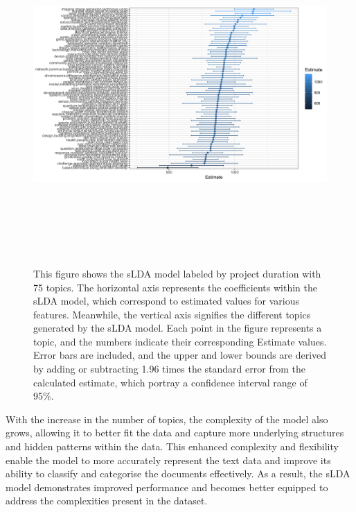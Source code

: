 \documentclass[12pt,twoside]{article}
\begin{document}
\begin{figure}[H]
    \hspace{-1cm}
    \includegraphics[width=18cm,height=13cm]{./figures/75-Duration}
    \caption{This figure shows the sLDA model labeled by project duration with 75 topics. The horizontal axis represents the coefficients within the sLDA model, which correspond to estimated values for various features. Meanwhile, the vertical axis signifies the different topics generated by the sLDA model. Each point in the figure represents a topic, and the numbers indicate their corresponding Estimate values. Error bars are included, and the upper and lower bounds are derived by adding or subtracting 1.96 times the standard error from the calculated estimate, which portray a confidence interval range of 95\%. }

\end{figure}

With the increase in the number of topics, the complexity of the model also grows, allowing it to better fit the data and capture more underlying structures and hidden patterns within the data. This enhanced complexity and flexibility enable the model to more accurately represent the text data and improve its ability to classify and categorise the documents effectively. As a result, the sLDA model demonstrates improved performance and becomes better equipped to address the complexities present in the dataset.\\\\
\end{document}
